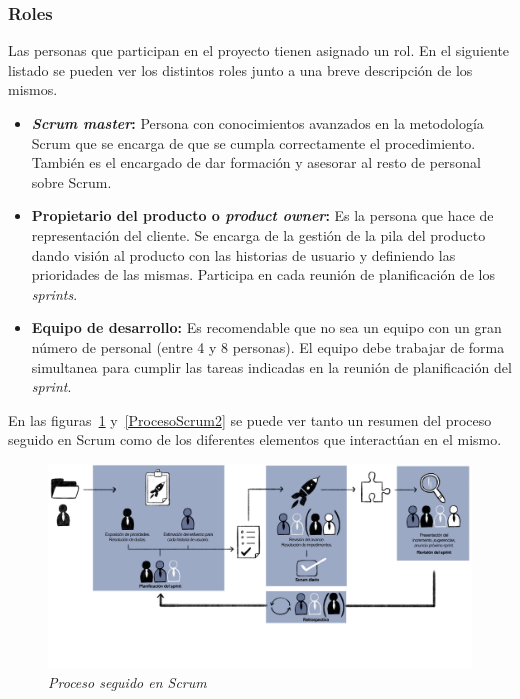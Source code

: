 \subsubsection{Roles}
Las personas que participan en el proyecto tienen asignado un rol. En el siguiente listado se pueden ver los distintos roles junto a una breve descripción de los mismos.
\begin{itemize}
\item \textbf{\textit{Scrum master}:}
Persona con conocimientos avanzados en la metodología Scrum que se encarga de que se cumpla correctamente el procedimiento. También es el encargado de dar formación y asesorar al resto de personal sobre Scrum.

\item \textbf{Propietario del producto o \textit{product owner}:}
Es la persona que hace de representación del cliente. Se encarga de la gestión de la pila del producto dando visión al producto con las historias de usuario y definiendo las prioridades de las mismas. Participa en cada reunión de planificación de los \textit{sprints}.

\item \textbf{Equipo de desarrollo:}
Es recomendable que no sea un equipo con un gran número de personal (entre 4 y 8 personas). El equipo debe trabajar de forma simultanea para cumplir las tareas indicadas en la reunión de planificación del \textit{sprint}.
\end{itemize}

En las figuras~\ref{ProcesoScrum1} y~\ref{ProcesoScrum2} se puede ver tanto un resumen del proceso seguido en Scrum como de los diferentes elementos que interactúan en el mismo.

\begin{figure}
	\centering
	\includegraphics[width=\textwidth]{../img/Scrum/Scrum.png}
	\caption{\textit{Proceso seguido en Scrum \cite{scrum}}}\label{ProcesoScrum1}
\end{figure}


